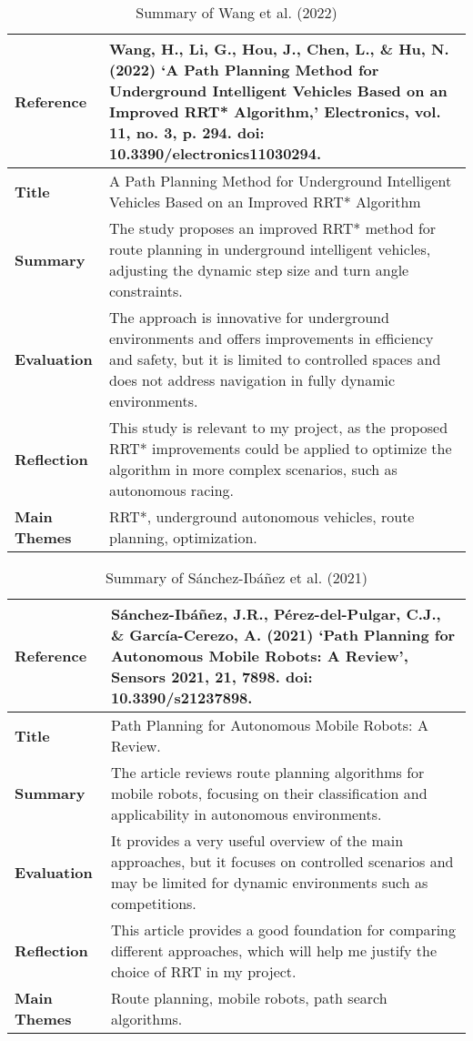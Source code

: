 \documentclass[a4paper,12pt]{report}
\begin{document}
\begin{table}[H]
    \centering
    \begin{tabular}{|p{3cm}|p{10cm}|}
        \hline
        \textbf{Reference} & Wang, H., Li, G., Hou, J., Chen, L., \& Hu, N. (2022) ‘A Path Planning Method for Underground Intelligent Vehicles Based on an Improved RRT* Algorithm,’ Electronics, vol. 11, no. 3, p. 294. doi: 10.3390/electronics11030294. \\ \hline
        \textbf{Title} & A Path Planning Method for Underground Intelligent Vehicles Based on an Improved RRT* Algorithm \\ \hline
        \textbf{Summary} & The study proposes an improved RRT* method for route planning in underground intelligent vehicles, adjusting the dynamic step size and turn angle constraints. \\ \hline
        \textbf{Evaluation} & The approach is innovative for underground environments and offers improvements in efficiency and safety, but it is limited to controlled spaces and does not address navigation in fully dynamic environments. \\ \hline
        \textbf{Reflection} & This study is relevant to my project, as the proposed RRT* improvements could be applied to optimize the algorithm in more complex scenarios, such as autonomous racing. \\ \hline
        \textbf{Main Themes} & RRT*, underground autonomous vehicles, route planning, optimization. \\ \hline
    \end{tabular}
    \caption{Summary of Wang et al. (2022)}
    \label{tab:wang2022}
\end{table}

\begin{table}[H]
    \centering
    \begin{tabular}{|p{3cm}|p{10cm}|}
        \hline
        \textbf{Reference} & Sánchez-Ibáñez, J.R., Pérez-del-Pulgar, C.J., \& García-Cerezo, A. (2021) ‘Path Planning for Autonomous Mobile Robots: A Review’, Sensors 2021, 21, 7898. doi: 10.3390/s21237898. \\ \hline
        \textbf{Title} & Path Planning for Autonomous Mobile Robots: A Review. \\ \hline
        \textbf{Summary} & The article reviews route planning algorithms for mobile robots, focusing on their classification and applicability in autonomous environments. \\ \hline
        \textbf{Evaluation} & It provides a very useful overview of the main approaches, but it focuses on controlled scenarios and may be limited for dynamic environments such as competitions. \\ \hline
        \textbf{Reflection} & This article provides a good foundation for comparing different approaches, which will help me justify the choice of RRT in my project. \\ \hline
        \textbf{Main Themes} & Route planning, mobile robots, path search algorithms. \\ \hline
    \end{tabular}
    \caption{Summary of Sánchez-Ibáñez et al. (2021)}
    \label{tab:sanchez2021}
\end{table}
\end{document}
